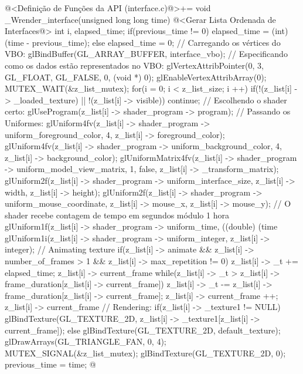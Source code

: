 \iniciocodigo
@<Definição de Funções da API (interface.c)@>+=
void _Wrender_interface(unsigned long long time){
  @<Gerar Lista Ordenada de Interfaces@>
  {
    int i, elapsed_time;
    if(previous_time != 0)
      elapsed_time = (int) (time - previous_time);
    else
      elapsed_time = 0;
    // Carregando os vértices do VBO:
    glBindBuffer(GL_ARRAY_BUFFER, interface_vbo);
    // Especificando como os dados estão representados no VBO:
    glVertexAttribPointer(0, 3, GL_FLOAT, GL_FALSE, 0,
                          (void *) 0);
    glEnableVertexAttribArray(0);
    MUTEX_WAIT(&z_list_mutex);
    for(i = 0; i < z_list_size; i ++){
      if(!(z_list[i] -> _loaded_texture) || !(z_list[i] -> visible))
        continue;
      // Escolhendo o shader certo:
      glUseProgram(z_list[i] -> shader_program -> program);
      // Passando os Uniformes:
      glUniform4fv(z_list[i] -> shader_program -> uniform_foreground_color, 4,
                   z_list[i] -> foreground_color);
      glUniform4fv(z_list[i] -> shader_program -> uniform_background_color, 4,
                   z_list[i] -> background_color);
      glUniformMatrix4fv(z_list[i] -> shader_program ->
                           uniform_model_view_matrix, 1, false,
                         z_list[i] -> _transform_matrix);
      glUniform2f(z_list[i] -> shader_program -> uniform_interface_size,
                  z_list[i] -> width, z_list[i] -> height);
      glUniform2f(z_list[i] -> shader_program -> uniform_mouse_coordinate,
                  z_list[i] -> mouse_x, z_list[i] -> mouse_y);
      // O shader recebe contagem de tempo em segundos módulo 1 hora
      glUniform1f(z_list[i] -> shader_program -> uniform_time,
                  ((double) (time %
      glUniform1i(z_list[i] -> shader_program -> uniform_integer,
                 z_list[i] -> integer);
      // Animating texture
      if(z_list[i] -> animate && z_list[i] -> number_of_frames > 1 &&
         z_list[i] -> max_repetition != 0){
        z_list[i] -> _t += elapsed_time;
        z_list[i] -> current_frame %
        while(z_list[i] -> _t >
                     z_list[i] -> frame_duration[z_list[i] -> current_frame]){
          z_list[i] -> _t -=
            z_list[i] -> frame_duration[z_list[i] -> current_frame];
          z_list[i] -> current_frame ++;
          z_list[i] -> current_frame %
        }
      }
      // Rendering:
      if(z_list[i] -> _texture1 != NULL)
        glBindTexture(GL_TEXTURE_2D,
                      z_list[i] -> _texture1[z_list[i] -> current_frame]);
      else
        glBindTexture(GL_TEXTURE_2D, default_texture);
      glDrawArrays(GL_TRIANGLE_FAN, 0, 4);
    }
    MUTEX_SIGNAL(&z_list_mutex);
    glBindTexture(GL_TEXTURE_2D, 0);
  }
  previous_time = time;
}
@
\fimcodigo

